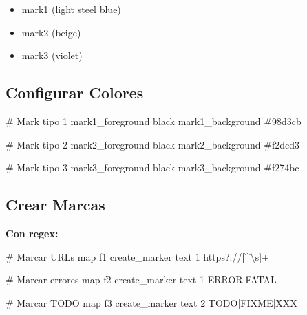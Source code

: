\documentclass[
  doc,
  floatsintext,
  longtable,
  a4paper,
  nolmodern,
  notxfonts,
  notimes,
  12pt,
  colorlinks=true,linkcolor=blue,citecolor=blue,urlcolor=blue]{apa7}
\newenvironment{Shaded}{\begin{snugshade}}{\end{snugshade}}
\newcommand{\AlertTok}[1]{\textcolor[rgb]{0.68,0.00,0.00}{#1}}
\newcommand{\CommentTok}[1]{\textcolor[rgb]{0.37,0.37,0.37}{#1}}
\newcommand{\DataTypeTok}[1]{\textcolor[rgb]{0.68,0.00,0.00}{#1}}
\newcommand{\ErrorTok}[1]{\textcolor[rgb]{0.68,0.00,0.00}{#1}}
\newcommand{\KeywordTok}[1]{\textcolor[rgb]{0.00,0.23,0.31}{\textbf{#1}}}
\providecommand{\tightlist}{%
  \setlength{\itemsep}{0pt}\setlength{\parskip}{0pt}}
\begin{document}
\begin{itemize}
\tightlist
\item
  mark1 (light steel blue)
\item
  mark2 (beige)
\item
  mark3 (violet)
\end{itemize}

\subsection{Configurar Colores}\label{configurar-colores}

\begin{Shaded}
\begin{Highlighting}[]
\CommentTok{\# Mark tipo 1}
\DataTypeTok{mark1\_foreground} \DataTypeTok{black}
\DataTypeTok{mark1\_background} \CommentTok{\#98d3cb}

\CommentTok{\# Mark tipo 2}
\DataTypeTok{mark2\_foreground} \DataTypeTok{black}
\DataTypeTok{mark2\_background} \CommentTok{\#f2dcd3}

\CommentTok{\# Mark tipo 3}
\DataTypeTok{mark3\_foreground} \DataTypeTok{black}
\DataTypeTok{mark3\_background} \CommentTok{\#f274bc}
\end{Highlighting}
\end{Shaded}

\subsection{Crear Marcas}\label{crear-marcas}

\textbf{Con regex:}

\begin{Shaded}
\begin{Highlighting}[]
\CommentTok{\# Marcar URLs}
\DataTypeTok{map} \DataTypeTok{f1} \DataTypeTok{create\_marker} \DataTypeTok{text} \DataTypeTok{1} \DataTypeTok{https}\ErrorTok{?://}\KeywordTok{[}\ErrorTok{\^{}\textbackslash{}}\DataTypeTok{s}\ErrorTok{]+}

\CommentTok{\# Marcar errores}
\DataTypeTok{map} \DataTypeTok{f2} \DataTypeTok{create\_marker} \DataTypeTok{text} \DataTypeTok{1} \DataTypeTok{ERROR}\ErrorTok{|}\DataTypeTok{FATAL}

\CommentTok{\# Marcar }\AlertTok{TODO}
\DataTypeTok{map} \DataTypeTok{f3} \DataTypeTok{create\_marker} \DataTypeTok{text} \DataTypeTok{2} \DataTypeTok{TODO}\ErrorTok{|}\DataTypeTok{FIXME}\ErrorTok{|}\DataTypeTok{XXX}
\end{Highlighting}
\end{Shaded}
\end{document}
